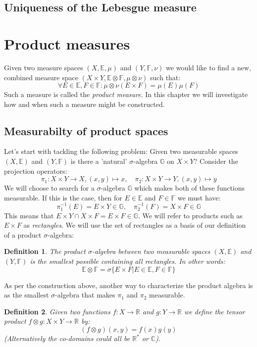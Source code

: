 \documentclass[12pt, a4paper]{article}
\newtheorem{definition}{Definition}[section]
\numberwithin{equation}{section}
\begin{document}
\subsection{Uniqueness of the Lebesgue measure}

\section{Product measures}
Given two measure spaces $(X,\mathbb{E},\mu)$ and $(Y,\mathbb{F},\nu)$ we would like to find a new, combined measure space $(X\times Y,\mathbb{E}\otimes\mathbb{F},\mu\otimes\nu)$ such that:
\begin{equation}
\forall E\in\mathbb{E}, F\in\mathbb{F}: \mu\otimes\nu(E\times F)=\mu(E)\mu(F)
\end{equation}
Such a measure is called the \textit{product measure}. In this chapter we will investigate how and when such a measure might be constructed.

\subsection{Measurabilty of product spaces}
Let's start with tackling the following problem: Given two measurable spaces $(X,\mathbb{E})$ and $(Y,\mathbb{F})$ is there a 'natural' $\sigma$-algebra $\mathbb{G}$ on $X\times Y$? Consider the projection operators:
\begin{equation}
\pi_1: X\times Y\rightarrow X, (x,y)\mapsto x,\quad\pi_2: X\times Y\rightarrow Y, (x,y)\mapsto y
\end{equation}
We will choose to search for a $\sigma$-algebra $\mathbb{G}$ which makes both of these functions measurable. If this is the case, then for $E\in\mathbb{E}$ and $F\in\mathbb{F}$ we must have:
\begin{equation}
\pi_1^{-1}(E)=E\times Y\in\mathbb{G},\quad\pi_2^{-1}(F)=X\times F\in\mathbb{G}
\end{equation}
This means that $E\times Y\cap X\times F=E\times F\in\mathbb{G}$. We will refer to products such as $E\times F$ as \textit{rectangles}. We will use the set of rectangles as a basis of our definition of a product $\sigma$-algebra:
\begin{definition}
The product $\sigma$-algebra between two measurable spaces $(X,\mathbb{E})$ and $(Y,\mathbb{F})$ is the smallest possible containing all rectangles. In other words:
\begin{equation}
\mathbb{E}\otimes\mathbb{F}=\sigma\{E\times F|E\in\mathbb{E},F\in\mathbb{F}\}
\end{equation}
\end{definition}
As per the construction above, another way to characterize the product algebra is as the smallest $\sigma$-algebra that makes $\pi_1$ and $\pi_2$ measurable.
\begin{definition}
Given two functions $f:X\rightarrow\mathbb{R}$ and $g:Y\rightarrow\mathbb{R}$ we define the tensor product $f\otimes g: X\times Y\rightarrow\mathbb{R}$ by:
\begin{equation}
(f\otimes g)(x,y)=f(x)g(y)
\end{equation}
(Alternatively the co-domains could all be $\mathbb{R}^*$ or $\mathbb{C}$).
\end{definition}
\end{document}
